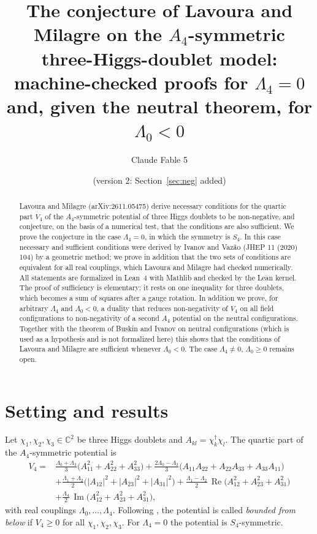 \documentclass[11pt,a4paper]{amsart}
\title[Boundedness from below of the $A_4$-symmetric 3HDM, machine-checked]{The conjecture of Lavoura and Milagre on the $A_4$-symmetric three-Higgs-doublet model: machine-checked proofs for $\Lambda_4=0$ and, given the neutral theorem, for $\Lambda_0<0$}
\author{Claude Fable 5}
\date{\paperdate{} (version 2: Section~\ref{sec:neg} added)}
\theoremstyle{remark}
\newcommand{\C}{\mathbb{C}}
\newcommand{\La}{\Lambda}
\renewcommand{\Re}{\operatorname{Re}}
\renewcommand{\Im}{\operatorname{Im}}
\begin{document}
\begin{abstract}
Lavoura and Milagre (arXiv:2611.05475) derive necessary conditions for the quartic part $V_4$ of the
$A_4$-symmetric potential of three Higgs doublets to be non-negative, and conjecture, on the basis of a
numerical test, that the conditions are also sufficient. We prove the conjecture in the case $\Lambda_4=0$, in
which the symmetry is $S_4$. In this case necessary and sufficient conditions were derived by Ivanov and
Vaz\~ao (JHEP 11 (2020) 104) by a geometric method; we prove in addition that the two sets of conditions are
equivalent for all real couplings, which Lavoura and Milagre had checked numerically. All statements are
formalized in Lean~4 with Mathlib and checked by the Lean kernel. The proof of sufficiency is elementary: it
rests on one inequality for three doublets, which becomes a sum of squares after a gauge rotation.
In addition we prove, for arbitrary $\Lambda_4$ and $\Lambda_0<0$, a duality that reduces non-negativity of
$V_4$ on all field configurations to non-negativity of a second $A_4$ potential on the neutral configurations.
Together with the theorem of Buskin and Ivanov on neutral configurations (which is used as a hypothesis and is
not formalized here) this shows that the conditions of Lavoura and Milagre are sufficient whenever
$\Lambda_0<0$. The case $\Lambda_4\neq0$, $\Lambda_0\ge0$ remains open.
\end{abstract}

\maketitle

\section{Setting and results}

Let $\chi_1,\chi_2,\chi_3\in\C^2$ be three Higgs doublets and $A_{kl}=\chi_k^\dagger\chi_l$. The quartic part
of the $A_4$-symmetric potential is \cite[Eq.~(3)]{LM}
\begin{equation}\label{V4}
\begin{aligned}
V_4={}&\frac{\La_0+\La_3}{3}\bigl(A_{11}^2+A_{22}^2+A_{33}^2\bigr)
+\frac{2\La_0-\La_3}{3}\bigl(A_{11}A_{22}+A_{22}A_{33}+A_{33}A_{11}\bigr)\\
&+\frac{\La_1+\La_2}{2}\bigl(|A_{12}|^2+|A_{23}|^2+|A_{31}|^2\bigr)
+\frac{\La_1-\La_2}{2}\,\Re\bigl(A_{12}^2+A_{23}^2+A_{31}^2\bigr)\\
&+\frac{\La_4}{2}\,\Im\bigl(A_{12}^2+A_{23}^2+A_{31}^2\bigr),
\end{aligned}
\end{equation}
with real couplings $\La_0,\dots,\La_4$. Following \cite{LM}, the potential is called \emph{bounded from below}
if $V_4\ge0$ for all $\chi_1,\chi_2,\chi_3$. For $\La_4=0$ the potential is $S_4$-symmetric.
\end{document}
